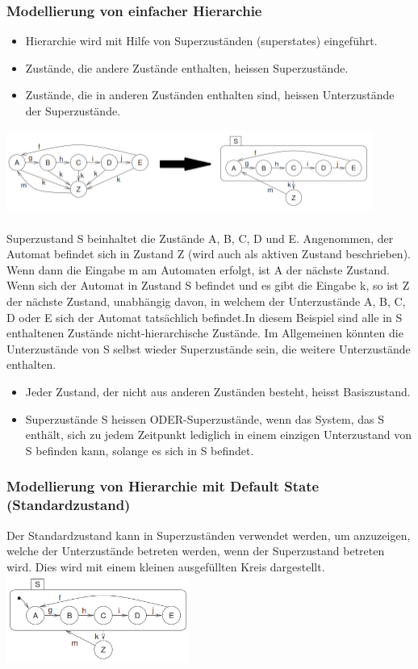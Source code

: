 {\subsubsection{Modellierung von einfacher Hierarchie}
\begin{itemize}
  \item Hierarchie wird mit Hilfe von Superzuständen (superstates) eingeführt.
  \item Zustände, die andere Zustände enthalten, heissen Superzustände.
  \item Zustände, die in anderen Zuständen enthalten sind, heissen Unterzustände der Superzustände.
\end{itemize}
\includegraphics[width = 12cm]{images/FSM/Hierarchie}\\\\
Superzustand S beinhaltet die Zustände A, B, C, D und E. Angenommen, der Automat befindet sich in Zustand Z (wird auch als aktiven Zustand beschrieben). Wenn dann die Eingabe m am Automaten erfolgt, ist A der nächste Zustand. Wenn sich der Automat in Zustand S befindet und es gibt die Eingabe k, so ist Z der nächste Zustand, unabhängig davon, in welchem
der Unterzustände A, B, C, D oder E sich der Automat tatsächlich befindet.In diesem Beispiel sind alle in S enthaltenen Zustände nicht-hierarchische Zustände. Im Allgemeinen könnten die Unterzustände von S selbst wieder Superzustände sein, die weitere Unterzustände enthalten.
\begin{itemize}
  \item Jeder Zustand, der nicht aus anderen Zuständen besteht, heisst Basiszustand.
  \item Superzustände S heissen ODER-Superzustände, wenn das System, das S enthält, sich zu jedem Zeitpunkt lediglich in einem einzigen Unterzustand von S befinden kann, solange es sich in S befindet.
\end{itemize}

\subsubsection{Modellierung von Hierarchie mit Default State (Standardzustand)}
Der Standardzustand kann in Superzuständen verwendet werden, um anzuzeigen, welche der Unterzustände
betreten werden, wenn der Superzustand betreten wird. 
Dies wird mit einem kleinen ausgefüllten Kreis dargestellt.\\
\includegraphics[width = 6cm]{images/FSM/Hierarchie_DefaultState}

}
